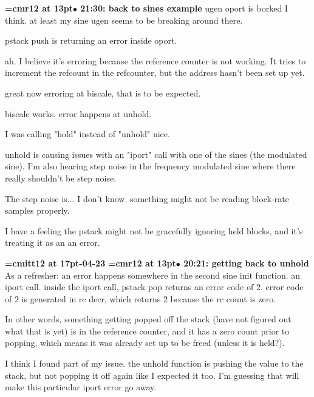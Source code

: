 {\smallskip\noindent\bf\font\titlefont=cmr12 at 13pt\titlefont $\bullet$ 21:30: back to sines example}\smallskip
ugen oport is borked I think. at least my sine ugen seems to be breaking around there.
\par

pstack push is returning an error inside oport.
\par

ah. I believe it's erroring because the reference counter is not working. It tries to increment the refcount in the refcounter, but the address hasn't been set up yet.
\par

great now erroring at biscale, that is to be expected.
\par

biscale works. error happens at unhold.
\par

I was calling "hold" instead of "unhold" nice.
\par

unhold is causing issues with an "iport" call with one of the sines (the modulated sine). I'm also hearing step noise in the frequency modulated sine where there really shouldn't be step noise.
\par

The step noise is... I don't know. something might not be reading block-rate samples properly.
\par

I have a feeling the pstack might not be gracefully ignoring held blocks, and it's treating it as an an error.
\par

{\medskip\noindent\bf\font\titlefont=cmitt12 at 17pt-04-23}\medskip
{\smallskip\noindent\bf\font\titlefont=cmr12 at 13pt\titlefont $\bullet$ 20:21: getting back to unhold}\smallskip
As a refresher: an error happens somewhere in the second sine init function. an iport call. inside the iport call, pstack pop returns an error code of 2. error code of 2 is generated in rc decr, which returns 2 because the rc count is zero.
\par

In other words, something getting popped off the stack (have not figured out what that is yet) is in the reference counter, and it has a zero count prior to popping, which means it was already set up to be freed (unless it is held?).
\par

I think I found part of my issue. the unhold function is pushing the value to the stack, but not popping it off again like I expected it too. I'm guessing that will make this particular iport error go away.
\par


